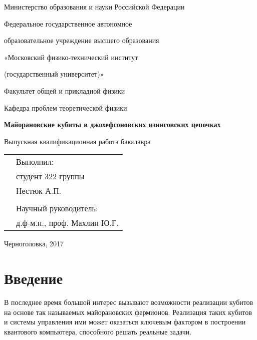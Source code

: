 \documentclass[a4paper,12pt]{article}
\author{}
\title{}
\date{\today}
\theoremstyle{plain} %
\theoremstyle{definition} %
\theoremstyle{remark} %
\begin{document}
    
\begin{titlepage}
    \begin{center}
        Министерство образования и науки Российской Федерации
        \linebreak
        
        Федеральное государственное автономное
        
        образовательное учреждение высшего образования 
        
        «Московский физико-технический институт 
        
        (государственный университет)»
        \linebreak
        
        Факультет общей и прикладной физики
        
        Кафедра проблем теоретической физики
        \vspace{100pt}
        
        \textbf{\LARGE Майорановские кубиты в джохефсоновских изинговских цепочках}
        \linebreak
        
        Выпускная квалификационная работа бакалавра
     \end{center}
     \vspace{90pt}
     
     \begin{flushright}
         \begin{tabular}{cl}
         &Выполнил:\\
         &студент 322 группы\\         
         &Нестюк А.П.\\
         &\\
         &Научный руководитель:\\
         &д.ф-м.н., проф. Махлин Ю.Г.
        \end{tabular}
    \end{flushright}
    \vspace{60pt}
    
    \begin{center}
        Черноголовка, 2017
    \end{center}
 \end{titlepage}   

\tableofcontents
\pagebreak

\section{Введение}
В последнее время большой интерес вызывают возможности реализации кубитов на основе так называемых майорановских фермионов. Реализация таких кубитов и системы управления ими может оказаться ключевым фактором в построении квантового компьютера, способного решать реальные задачи.
\end{document}
